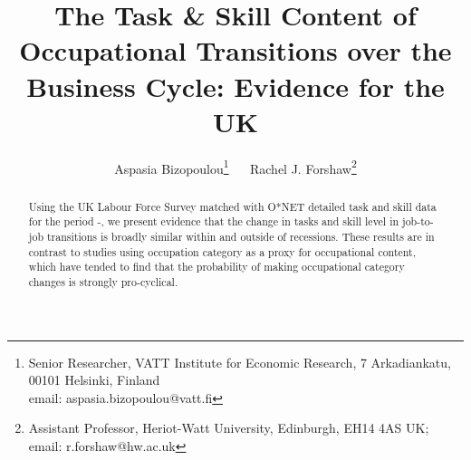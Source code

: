 \documentclass[11pt, oneside]{article}
\begin{document}
	



		
	\author{Aspasia Bizopoulou\footnote{Senior Researcher, VATT Institute for Economic Research, 7 Arkadiankatu, 00101 Helsinki, Finland\\ email: aspasia.bizopoulou@vatt.fi} $\quad$ Rachel J. Forshaw\footnote{Assistant Professor, Heriot-Watt University, Edinburgh, EH14 4AS UK; email: r.forshaw@hw.ac.uk}} 
	\title{\textbf{The Task \& Skill Content of Occupational Transitions over the Business Cycle: Evidence for the UK}}

	
	\maketitle
	
	\vspace{-5mm}
	
	\begin{abstract}
		
		Using the UK Labour Force Survey matched with O*NET detailed task and skill data for the period \hspace{-1mm}-\hspace{-1mm}, we present evidence that the change in tasks and skill level in job-to-job transitions is broadly similar within and outside of recessions. These results are in contrast to studies using occupation category as a proxy for occupational content, which have tended to find that the probability of making occupational category changes is strongly pro-cyclical. 

	
	

		
	\end{abstract}
\end{document}
